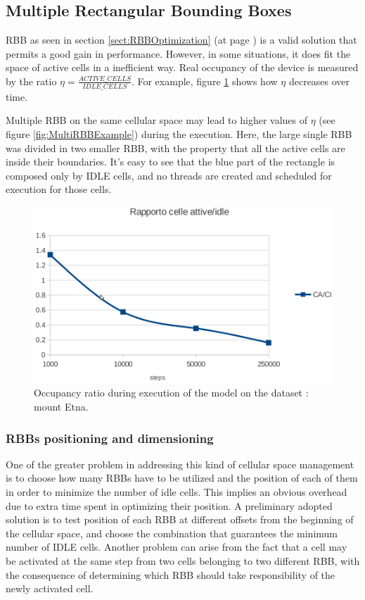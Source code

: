 \subsection{Multiple Rectangular Bounding Boxes}
RBB as seen in section \ref{sect:RBBOptimization} (at page
\pageref{sect:RBBOptimization}) is a valid solution that permits a good gain in
performance. However, in some situations, it does fit the space of active cells in a
inefficient way. Real occupancy of the device is measured by the ratio
\(\eta=\frac{ACTIVE\_CELLS}{IDLE\_CELLS}\). For example, figure
\ref{fig:activeIdleRatio} shows how \(\eta\) decreases over time.

 Multiple RBB on the same cellular space may lead to higher values of \(\eta\)
 (see figure \ref{fig:MultiRBBExample}) during the execution.
Here, the large single RBB was divided in two smaller RBB, with the property that all
the active cells are inside their boundaries. It's easy to see that the blue
part of the rectangle is composed only by IDLE cells, and no threads are created and
scheduled for execution for those cells.

\begin{figure}
\begin{center}
  \includegraphics[scale=0.33, trim=0.0cm 0.0cm 0cm 2cm,
  clip=true]{./images/activeIdleRatio}
  \caption{Occupancy ratio during execution of the model on the dataset  :
  \label{fig:activeIdleRatio}
  mount Etna.
  }
\end{center}
\end{figure}


\subsubsection{RBBs positioning and dimensioning}
One of the greater problem in addressing this kind of cellular space management
is to choose how many RBBs have to be utilized and the position of each of them
in order to minimize the number of idle cells. This implies an obvious overhead
due to extra time spent in optimizing their position.
A preliminary adopted solution is to test position of each RBB at different
offsets from the beginning of the cellular space, and choose the combination that guarantees
the minimum number of IDLE cells.
 Another problem can arise from the fact that a
cell may be activated at the same step from two cells belonging to two different
RBB, with the consequence of determining which RBB should take responsibility of the newly activated cell.


